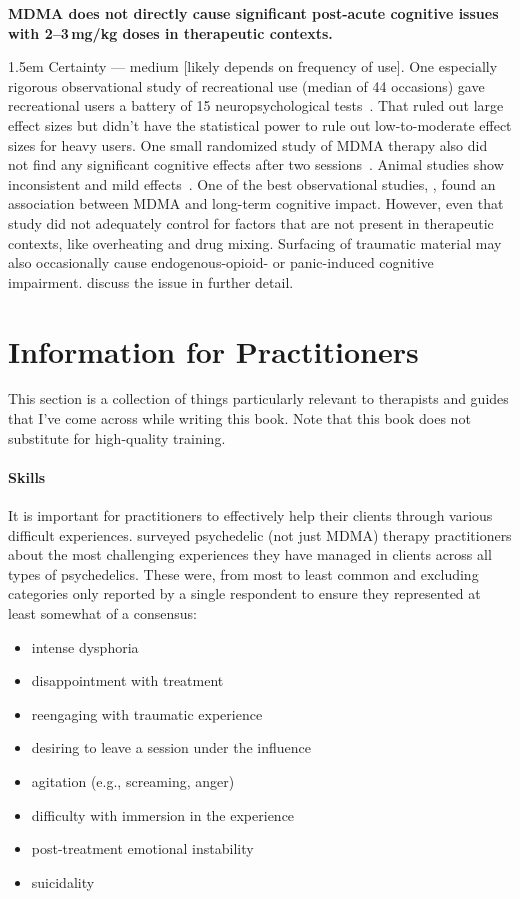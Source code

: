 \documentclass[11pt,oneside]{book}
\let\cite\parencite
\newcommand{\claim}[2]{%
    \par\medskip\noindent\textbf{#1}%
    \begin{adjustwidth}{1.5em}{}%
    \setlength{\parindent}{0pt}%
    \setlength{\parskip}{0.5\baselineskip}%
    #2%
    \end{adjustwidth}%
}
\begin{document}
\claim{MDMA does not directly cause significant post-acute cognitive issues with 2--3\,mg/kg doses in therapeutic contexts.}{Certainty --- medium [likely depends on frequency of use]. One especially rigorous observational study of recreational use (median of 44 occasions) gave recreational users a battery of 15 neuropsychological tests~\cite{halpernMormonRavers}. That ruled out large effect sizes but didn't have the statistical power to rule out low-to-moderate effect sizes for heavy users. One small randomized study of MDMA therapy also did not find any significant cognitive effects after two sessions~\cite{mithoeferSafety}. Animal studies show inconsistent and mild effects~\cite{baggottDamage}. One of the best observational studies, \textcite{corayMemory}, found an association between MDMA and long-term cognitive impact. However, even that study did not adequately control for factors that are not present in therapeutic contexts, like overheating and drug mixing. Surfacing of traumatic material may also occasionally cause endogenous-opioid- or panic-induced cognitive impairment. \textcite{wolfgang2025,passieHistory} discuss the issue in further detail.}

\chapter{Information for Practitioners}
\label{practitionerSkills}
This section is a collection of things particularly relevant to therapists and guides that I've come across while writing this book. Note that this book does not substitute for high-quality training.

\subsubsection*{Skills}
It is important for practitioners to effectively help their clients through various difficult experiences. \textcite{bender2025provider} surveyed psychedelic (not just MDMA) therapy practitioners about the most challenging experiences they have managed in clients across all types of psychedelics. These were, from most to least common and excluding categories only reported by a single respondent to ensure they represented at least somewhat of a consensus:
\begin{itemize}
    \item intense dysphoria
    \item disappointment with treatment
    \item reengaging with traumatic experience
    \item desiring to leave a session under the influence
    \item agitation (e.g., screaming, anger)
    \item difficulty with immersion in the experience
    \item post-treatment emotional instability
    \item suicidality
\end{itemize}
\end{document}
